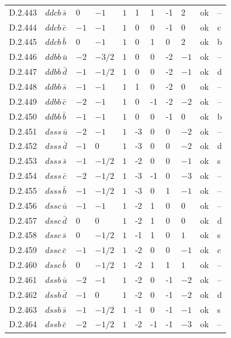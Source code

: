 {\begin{longtable}{@{}llllllllll>{\raggedright\arraybackslash}p{2.0cm}@{}}
D.2.443 & $ddcb\,\bar{s}$ & $0$ & $-1$ & $1$ & 1 & 1 & -1 & $2$ & ok & -- \\
D.2.444 & $ddcb\,\bar{c}$ & $-1$ & $-1$ & $1$ & 0 & 0 & -1 & $0$ & ok & c \\
D.2.445 & $ddcb\,\bar{b}$ & $0$ & $-1$ & $1$ & 0 & 1 & 0 & $2$ & ok & b \\
D.2.446 & $ddbb\,\bar{u}$ & $-2$ & $-3/2$ & $1$ & 0 & 0 & -2 & $-1$ & ok & -- \\
D.2.447 & $ddbb\,\bar{d}$ & $-1$ & $-1/2$ & $1$ & 0 & 0 & -2 & $-1$ & ok & d \\
D.2.448 & $ddbb\,\bar{s}$ & $-1$ & $-1$ & $1$ & 1 & 0 & -2 & $0$ & ok & -- \\
D.2.449 & $ddbb\,\bar{c}$ & $-2$ & $-1$ & $1$ & 0 & -1 & -2 & $-2$ & ok & -- \\
D.2.450 & $ddbb\,\bar{b}$ & $-1$ & $-1$ & $1$ & 0 & 0 & -1 & $0$ & ok & b \\
D.2.451 & $dsss\,\bar{u}$ & $-2$ & $-1$ & $1$ & -3 & 0 & 0 & $-2$ & ok & -- \\
D.2.452 & $dsss\,\bar{d}$ & $-1$ & $0$ & $1$ & -3 & 0 & 0 & $-2$ & ok & d \\
D.2.453 & $dsss\,\bar{s}$ & $-1$ & $-1/2$ & $1$ & -2 & 0 & 0 & $-1$ & ok & s \\
D.2.454 & $dsss\,\bar{c}$ & $-2$ & $-1/2$ & $1$ & -3 & -1 & 0 & $-3$ & ok & -- \\
D.2.455 & $dsss\,\bar{b}$ & $-1$ & $-1/2$ & $1$ & -3 & 0 & 1 & $-1$ & ok & -- \\
D.2.456 & $dssc\,\bar{u}$ & $-1$ & $-1$ & $1$ & -2 & 1 & 0 & $0$ & ok & -- \\
D.2.457 & $dssc\,\bar{d}$ & $0$ & $0$ & $1$ & -2 & 1 & 0 & $0$ & ok & d \\
D.2.458 & $dssc\,\bar{s}$ & $0$ & $-1/2$ & $1$ & -1 & 1 & 0 & $1$ & ok & s \\
D.2.459 & $dssc\,\bar{c}$ & $-1$ & $-1/2$ & $1$ & -2 & 0 & 0 & $-1$ & ok & c \\
D.2.460 & $dssc\,\bar{b}$ & $0$ & $-1/2$ & $1$ & -2 & 1 & 1 & $1$ & ok & -- \\
D.2.461 & $dssb\,\bar{u}$ & $-2$ & $-1$ & $1$ & -2 & 0 & -1 & $-2$ & ok & -- \\
D.2.462 & $dssb\,\bar{d}$ & $-1$ & $0$ & $1$ & -2 & 0 & -1 & $-2$ & ok & d \\
D.2.463 & $dssb\,\bar{s}$ & $-1$ & $-1/2$ & $1$ & -1 & 0 & -1 & $-1$ & ok & s \\
D.2.464 & $dssb\,\bar{c}$ & $-2$ & $-1/2$ & $1$ & -2 & -1 & -1 & $-3$ & ok & -- \\

\end{longtable}}

